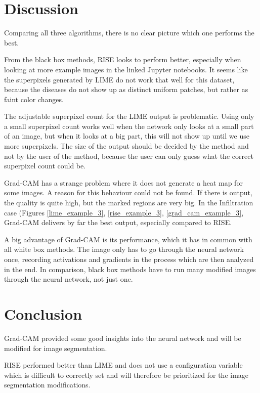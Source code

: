 \section{Discussion}
Comparing all three algorithms, there is no clear picture which one performs the best.

From the black box methods, RISE looks to perform better, especially when looking at more example images in the linked Jupyter notebooks. It seems like
the superpixels generated by LIME do not work that well for this dataset, because the diseases do not show up as distinct uniform patches, but rather as faint color changes.

The adjustable superpixel count for the LIME output is problematic. Using only a small superpixel count works well when the network only looks at a small part of an image, but when it looks
at a big part, this will not show up until we use more superpixels. The size of the output should be decided by the method and not by the user of the method, because the user can only guess what
the correct superpixel count could be.

Grad-CAM has a strange problem where it does not generate a heat map for some images. A reason for this behaviour could not be found. If there is output,
the quality is quite high, but the marked regions are very big. In the Infiltration case (Figures \ref{lime_example_3}, \ref{rise_example_3}, \ref{grad_cam_example_3}, Grad-CAM delivers by far
the best output, especially compared to RISE.

A big advantage of Grad-CAM is its performance, which it has in common with all white box methods. The image only has to go through the neural network once, recording activations and gradients in the process which are then analyzed in the end. In comparison, black box methods have to run many modified images through the neural network, not just one.

\section{Conclusion}
Grad-CAM provided some good insights into the neural network and will be modified for image segmentation.

RISE performed better than LIME and does not use a configuration variable which is difficult to correctly set and will therefore be prioritized for the image segmentation modifications.
